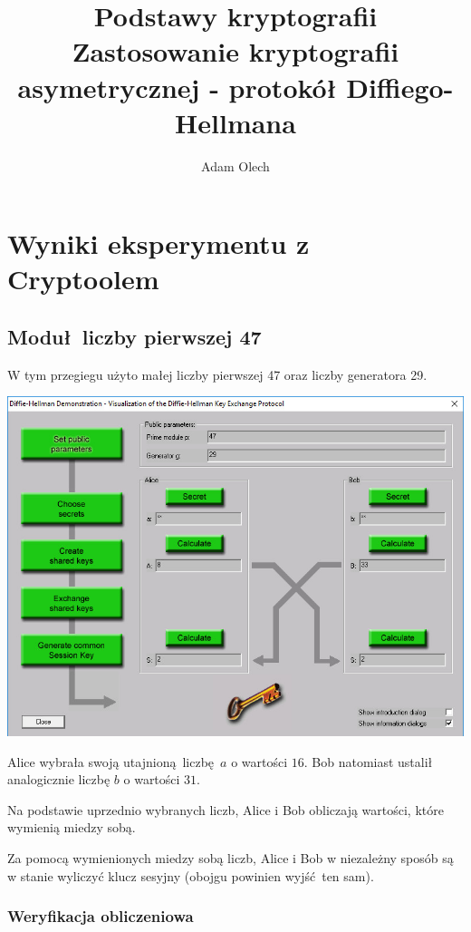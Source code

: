 \documentclass[12pt]{article}
\title{Podstawy kryptografii \\ \large Zastosowanie kryptografii asymetrycznej - protokół Diffiego-Hellmana}
\author{Adam Olech}
\begin{document}
\maketitle

\tableofcontents
\newpage

\section{Wyniki eksperymentu z Cryptoolem}

\subsection{Moduł liczby pierwszej 47}

W tym przegiegu użyto małej liczby pierwszej 47 oraz liczby generatora 29.

\begin{center}
	\includegraphics[scale=0.3]{4-cryptool-1}
\end{center}

Alice wybrała swoją utajnioną liczbę $a$ o wartości $16$.
Bob natomiast ustalił analogicznie liczbę $b$ o wartości $31$.

Na podstawie uprzednio wybranych liczb, Alice i Bob obliczają wartości, które wymienią miedzy sobą.

Za pomocą wymienionych miedzy sobą liczb, Alice i Bob w niezależny sposób są w stanie wyliczyć klucz sesyjny (obojgu powinien wyjść ten sam).

\subsubsection{Weryfikacja obliczeniowa}
\end{document}
